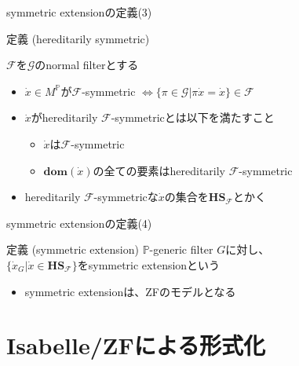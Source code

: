\documentclass[17pt,aspectratio=169]{beamer}
\newcommand{\Pbb}{\mathbb{P}}
\newcommand{\Gcal}{\mathcal{G}}
\newcommand{\Fcal}{\mathcal{F}}
\begin{document}
\begin{frame}{symmetric extensionの定義(3)}
    \begin{itembox}[l]{定義 (hereditarily symmetric)}
        {\small
            $\Fcal$を$\Gcal$のnormal filterとする
            \vspace{5pt}
            \begin{itemize}
                \setlength{\itemsep}{2pt}
                \vspace{-10pt}
                \item $\dot{x} \in M^\Pbb$が$\Fcal$-symmetric $\Leftrightarrow \{ \pi \in \Gcal | \pi \dot{x} = \dot{x} \} \in \Fcal$
                \item $\dot{x}$がhereditarily $\Fcal$-symmetricとは以下を満たすこと
                      \vspace{-3pt}
                      \begin{itemize}
                          \item $\dot{x}$は$\Fcal$-symmetric
                          \item $\bm{\mathbf{dom}}(\dot{x})$の全ての要素はhereditarily $\Fcal$-symmetric
                      \end{itemize}
                \item hereditarily $\Fcal$-symmetricな$\dot{x}$の集合を$\bm{\mathbf{HS}}_{\Fcal}$とかく

            \end{itemize}
        }
    \end{itembox}
\end{frame}

\begin{frame}{symmetric extensionの定義(4)}
    \begin{itembox}[l]{定義 (symmetric extension)}
        {\small
            $\Pbb$-generic filter $G$に対し、\\$\{ \dot{x}_G | \dot{x} \in \bm{\mathbf{HS}}_{\Fcal} \}$をsymmetric extensionという
        }
    \end{itembox}

    \begin{itemize}
        \item symmetric extensionは、ZFのモデルとなる
    \end{itemize}
\end{frame}

\section {Isabelle/ZFによる形式化}
\end{document}
